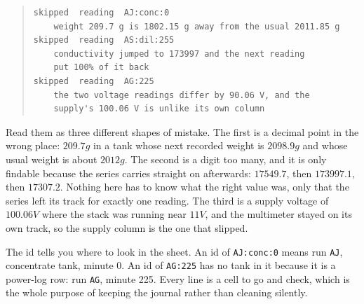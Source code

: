 \begin{quote}\footnotesize
\begin{verbatim}
skipped  reading  AJ:conc:0
    weight 209.7 g is 1802.15 g away from the usual 2011.85 g
skipped  reading  AS:dil:255
    conductivity jumped to 173997 and the next reading
    put 100% of it back
skipped  reading  AG:225
    the two voltage readings differ by 90.06 V, and the
    supply's 100.06 V is unlike its own column
\end{verbatim}
\end{quote}

Read them as three different shapes of mistake. The first is a decimal point in the wrong
place: $209.7\unit{g}$ in a tank whose next recorded weight is $2098.9\unit{g}$ and whose usual
weight is about $2012\unit{g}$. The second is a digit too many, and it is only findable because
the series carries straight on afterwards: $17549.7$, then $173997.1$, then $17307.2$. Nothing
here has to know what the right value was, only that the series left its track for exactly one
reading. The third is a supply voltage of $100.06\unit{V}$ where the stack was running near
$11\unit{V}$, and the multimeter stayed on its own track, so the supply column is the one that
slipped.

The id tells you where to look in the sheet. An id of \texttt{AJ:conc:0} means run
\texttt{AJ}, concentrate tank, minute 0. An id of \texttt{AG:225} has no tank in it because it
is a power-log row: run \texttt{AG}, minute 225. Every line is a cell to go and check, which is
the whole purpose of keeping the journal rather than cleaning silently.
